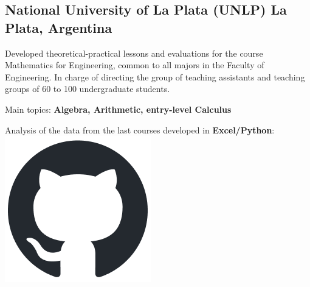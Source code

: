 
\subsection{{National University of La Plata (UNLP) \hfill  La Plata, Argentina}}
\begin{zitemize}
\item Developed theoretical-practical lessons and evaluations for the course Mathematics for Engineering, common to all majors in the Faculty of Engineering. In charge of directing the group of teaching assistants and teaching groups of 60 to 100 undergraduate students.
\item Main topics: \textbf{Algebra, Arithmetic, entry-level Calculus}
\item Analysis of the data from the last courses developed in \textbf{Excel/Python}: \href{https://github.com/juanjogervasio/Intro-courses-analysis}{\includegraphics[scale=0.2]{github-mark.png}}

\end{zitemize}
